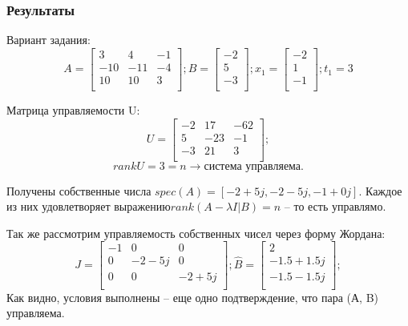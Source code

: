 \subsubsection{Результаты}
Вариант задания:
\[ A = \begin{bmatrix}
        3 & 4 & -1 \\
        -10 & -11 & -4 \\
        10 & 10 & 3 \\
        \end{bmatrix}; 
        B = \begin{bmatrix}
                -2 \\
                5 \\
                -3 \\
                \end{bmatrix}; 
        x_1 = \begin{bmatrix}
                -2 \\
                1 \\
                -1 \\
                \end{bmatrix}; 
        t_1 = 3
\]

Матрица управляемости U:
\[ U = \begin{bmatrix}
        -2 & 17 & -62 \\
        5 & -23 & -1 \\
        -3 & 21 & 3 \\
        \end{bmatrix};
\]
\[rankU = 3 = n \rightarrow \text{система управляема.}\]

Получены собственные числа \(spec(A) = [-2+5j, -2 -5j, -1+0j]\). Каждое из них удовлетворяет выражению\(rank(A - \lambda I | B) = n \) -- то есть управлямо.

Так же рассмотрим управляемость собственных чисел через форму Жордана:
\[
        J = \begin{bmatrix}
                -1 & 0 & 0 \\
                0 & -2 - 5j & 0 \\
                0 & 0 & -2 + 5j \\
                \end{bmatrix};
        \hat{B} = \begin{bmatrix}
                2 \\
                -1.5 + 1.5j \\
                -1.5 - 1.5j \\
                \end{bmatrix};
\]
Как видно, условия выполнены -- еще одно подтверждение, что пара (А, B) управляема.

